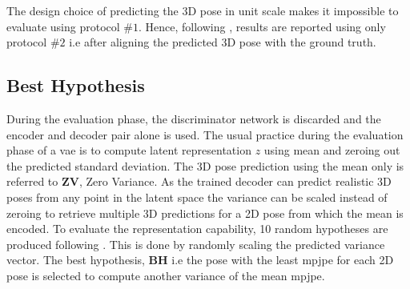 The design choice of predicting the 3D pose in unit scale makes it impossible to evaluate using protocol $\#1$. Hence, following \cite{amazon1}, results are reported using only protocol $\#2$ i.e after aligning the predicted 3D pose with the ground truth.

\subsection{Best Hypothesis}
During the evaluation phase, the discriminator network is discarded and the encoder and decoder pair alone is used. The usual practice during the evaluation phase of a \ac{vae} is to compute latent representation $z$ using mean and zeroing out the predicted standard deviation. The 3D pose prediction using the mean only is referred to $\textbf{ZV}$, Zero Variance. As the trained decoder can predict realistic 3D poses from any point in the latent space the variance can be scaled instead of zeroing to retrieve multiple 3D predictions for a 2D pose from which the mean is encoded. To evaluate the representation capability, 10 random hypotheses are produced following \cite{weaklymultiple}. This is done by randomly scaling the predicted variance vector. The best hypothesis, \textbf{BH} i.e the pose with the least \ac{mpjpe} for each 2D pose is selected to compute another variance of the mean \ac{mpjpe}. 
